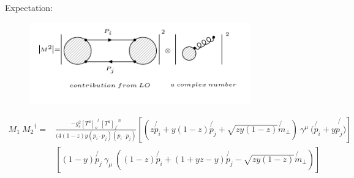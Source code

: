 \pagebreak
Expectation:
\begin{figure}[h!]
\centering
\includegraphics[width=0.85\textwidth]{images/QQ/expectationM1M2dagger.png}
\end{figure}

\begin{equation}
\begin{split}
M_1\: {M_2}^{\dagger} =& \frac{-g_s^2 {[T^a]_o}^l \:{[T^a]_{f^{\prime}}}^n }{(4(1-z)y(p_i \cdot p_j)(p_i \cdot p_j)} [(z\not{p_i} + y(1-z)\not{p_j} + \sqrt{zy(1-z)}\not{m}_{\bot})\: \gamma^{\mu} \: (\not{p_i} + y\not{p_j)}]\\
&[(1-y) \not{p_j} \:\gamma_{\mu} \: ((1-z)\not{p_i} + (1+yz-y) \not{p_j} - \sqrt{zy(1-z)}\not{m}_{\bot})]\:
\end{split}
\end{equation}

